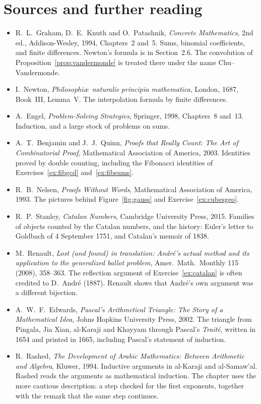 \section*{Sources and further reading}

\begin{itemize}\raggedright
\item R.~L.~Graham, D.~E.~Knuth and O.~Patashnik, \emph{Concrete Mathematics}, 2nd ed., Addison-Wesley, 1994, Chapters~2 and~5. Sums, binomial coefficients, and finite differences. Newton's formula is in Section~2.6. The convolution of Proposition~\ref{prop:vandermonde} is treated there under the name Chu--Vandermonde.
\item I.~Newton, \emph{Philosophi\ae\ naturalis principia mathematica}, London, 1687, Book~III, Lemma~V. The interpolation formula by finite differences.
\item A.~Engel, \emph{Problem-Solving Strategies}, Springer, 1998, Chapters~8 and~13. Induction, and a large stock of problems on sums.
\item A.~T.~Benjamin and J.~J.~Quinn, \emph{Proofs that Really Count: The Art of Combinatorial Proof}, Mathematical Association of America, 2003. Identities proved by double counting, including the Fibonacci identities of Exercises~\ref{ex:fibgcd} and~\ref{ex:fibsums}.
\item R.~B.~Nelsen, \emph{Proofs Without Words}, Mathematical Association of America, 1993. The pictures behind Figure~\ref{fig:gauss} and Exercise~\ref{ex:cubesgeo}.
\item R.~P.~Stanley, \emph{Catalan Numbers}, Cambridge University Press, 2015. Families of objects counted by the Catalan numbers, and the history: Euler's letter to Goldbach of 4 September 1751, and Catalan's memoir of 1838.
\item M.~Renault, \emph{Lost (and found) in translation: Andr\'e's actual method and its application to the generalized ballot problem}, Amer.\ Math.\ Monthly 115 (2008), 358--363. The reflection argument of Exercise~\ref{ex:catalan} is often credited to D.~Andr\'e (1887). Renault shows that Andr\'e's own argument was a different bijection.
\item A.~W.~F.~Edwards, \emph{Pascal's Arithmetical Triangle: The Story of a Mathematical Idea}, Johns Hopkins University Press, 2002. The triangle from Pingala, Jia Xian, al-Karaji and Khayyam through Pascal's \emph{Trait\'e}, written in 1654 and printed in 1665, including Pascal's statement of induction.
\item R.~Rashed, \emph{The Development of Arabic Mathematics: Between Arithmetic and Algebra}, Kluwer, 1994. Inductive arguments in al-Karaji and al-Samaw'al. Rashed reads the arguments as mathematical induction. The chapter uses the more cautious description: a step checked for the first exponents, together with the remark that the same step continues.

\end{itemize}
